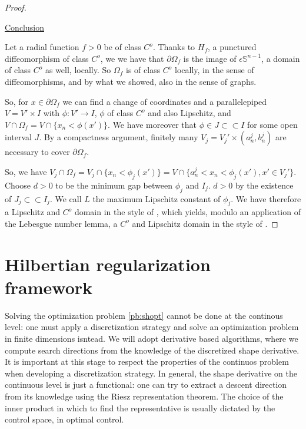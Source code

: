 \documentclass[english,a4paper,9pt,oneside]{scrbook}	%
\theoremstyle{break}
\newenvironment{mproof}[1][\proofname]{%
  \begin{proof}[#1]$ $\par\nobreak\ignorespaces
}{%
  \end{proof}
}
\renewcommand*{\proofname}{Proof}
\theoremstyle{remark}
\newcommand{\mS}{\mathbb{S}^{n-1}}
\newcommand{\cc}{\subset\subset}
\newcommand{\eps}{\epsilon}
\begin{document}
\begin{mproof}
\underline{Conclusion}

Let a radial function $f>0$ be of class $C^o$. Thanks to $H_f$, a punctured diffeomorphism of class $C^o$, we we have that $\partial \Omega_f$ is the image of $\eps\mS$, a domain of class $C^o$ as well, locally. So $\Omega_f $ is of class $C^o$ locally, in the sense of diffeomorphisms, and by what we showed, also in the sense of graphs.

So, for $x \in \partial \Omega_f$ we can find a change of coordinates and a parallelepiped $V = V'\times I$ with $\phi: V'\rightarrow I$, $\phi$ of class $C^o$ and also Lipschitz, and $V\cap 	\Omega_f = V\cap \{x_n<\phi(x')\}$. We have moreover that $\phi \in J \cc I$ for some open interval $J$. By a compactness argument, finitely many $V_j = V_j'\times (a_n^j, b_n^j) $ are necessary to cover $\partial \Omega_f$. 

So, we have $V_j \cap \Omega_f = V_j\cap \{x_n<\phi_j(x')\} = V\cap \{a_n^j<x_n<\phi_j(x'), x' \in V_j'\}$. Choose $d>0$ to be the minimum gap between $\phi_j$ and $I_j$. $d>0$ by the existence of $J_j \cc I_j$. We call $L$ the maximum Lipschitz constant of $\phi_j$. 
We have therefore a Lipschitz and $C^o$ domain in the style of \cite{burenkov}, which yields, modulo an application of the Lebesgue number lemma, a $C^o$ and Lipschitz domain in the style of \cite{grisvard}.
\end{mproof}

\section{Hilbertian regularization framework}
\label{sec:hilbert}

Solving the optimization problem \cref{pb:shopt} cannot be done at the continous level: one must apply a discretization strategy and solve an optimization problem in finite dimensions isntead. We will adopt derivative based algorithms, where we compute search directions from the knowledge of the discretized shape derivative. It is important at this stage to respect the properties of the continuos problem when developing a discretization strategy. In general, the shape derivative on the continuous level is just a functional: one can try to extract a descent direction from its knowledge using the Riesz representation theorem. The choice of the inner product in which to find the representative is usually dictated by the control space, in optimal control. 
\end{document}
